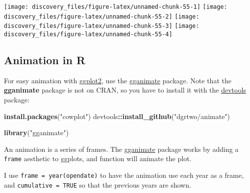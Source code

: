 \documentclass[]{book}
\newenvironment{Shaded}{\begin{snugshade}}{\end{snugshade}}
\newcommand{\KeywordTok}[1]{\textcolor[rgb]{0.13,0.29,0.53}{\textbf{#1}}}
\newcommand{\NormalTok}[1]{#1}
\newcommand{\OperatorTok}[1]{\textcolor[rgb]{0.81,0.36,0.00}{\textbf{#1}}}
\newcommand{\StringTok}[1]{\textcolor[rgb]{0.31,0.60,0.02}{#1}}
\theoremstyle{definition}
\theoremstyle{definition}
\theoremstyle{definition}
\theoremstyle{remark}
\begin{document}
\begin{center}\texttt{[image: discovery\_files/figure-latex/unnamed-chunk-55-1]} \texttt{[image: discovery\_files/figure-latex/unnamed-chunk-55-2]} \texttt{[image: discovery\_files/figure-latex/unnamed-chunk-55-3]} \texttt{[image: discovery\_files/figure-latex/unnamed-chunk-55-4]} \end{center}

\hypertarget{animation-in-r}{%
\subsection{Animation in R}\label{animation-in-r}}

For easy animation with
\href{https://cran.r-project.org/package=ggplot2}{ggplot2}, use the
\href{https://github.com/dgrtwo/gganimate}{gganimate} package. Note that
the \textbf{gganimate} package is not on CRAN, so you have to install it
with the \href{https://cran.r-project.org/package=devtools}{devtools}
package:

\begin{Shaded}
\begin{Highlighting}[]
\KeywordTok{install.packages}\NormalTok{(}\StringTok{"cowplot"}\NormalTok{)}
\NormalTok{devtools}\OperatorTok{::}\KeywordTok{install_github}\NormalTok{(}\StringTok{"dgrtwo/animate"}\NormalTok{)}
\end{Highlighting}
\end{Shaded}

\begin{Shaded}
\begin{Highlighting}[]
\KeywordTok{library}\NormalTok{(}\StringTok{"gganimate"}\NormalTok{)}
\end{Highlighting}
\end{Shaded}

An animation is a series of frames. The
\href{https://cran.r-project.org/package=gganimate}{gganimate} package
works by adding a \texttt{frame} aesthetic to ggplots, and function will
animate the plot.

I use \texttt{frame\ =\ year(opendate)} to have the animation use each
year as a frame, and \texttt{cumulative\ =\ TRUE} so that the previous
years are shown.
\end{document}
